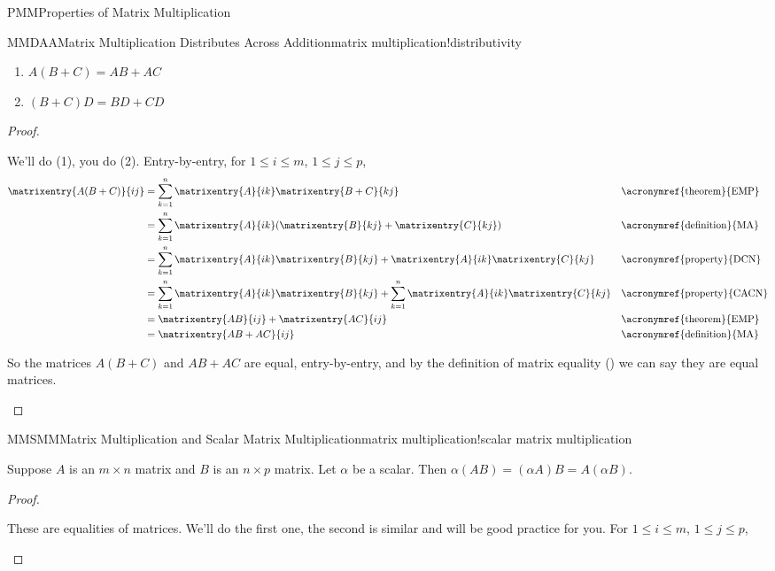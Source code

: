 \begin{subsect}{PMM}{Properties of Matrix Multiplication}
\begin{theorem}{MMDAA}{Matrix Multiplication Distributes Across Addition}{matrix multiplication!distributivity}
\begin{para}
\begin{enumerate}
\item $A(B+C)=AB+AC$
\item $(B+C)D=BD+CD$
\end{enumerate}
\end{para}
\end{theorem}
%
\begin{proof}
\begin{para}We'll do (1), you do (2).  Entry-by-entry, for $1\leq i\leq m$, $1\leq j\leq p$,
%
\begin{align*}
\matrixentry{A(B+C)}{ij}
&=
\sum_{k=1}^{n}\matrixentry{A}{ik}\matrixentry{B+C}{kj}&&\text{\acronymref{theorem}{EMP}}\\
&=\sum_{k=1}^{n}\matrixentry{A}{ik}(\matrixentry{B}{kj}+\matrixentry{C}{kj})&&\text{\acronymref{definition}{MA}}\\
&=\sum_{k=1}^{n}\matrixentry{A}{ik}\matrixentry{B}{kj}+\matrixentry{A}{ik}\matrixentry{C}{kj}
&&\text{\acronymref{property}{DCN}}\\
&=\sum_{k=1}^{n}\matrixentry{A}{ik}\matrixentry{B}{kj}+\sum_{k=1}^{n}\matrixentry{A}{ik}\matrixentry{C}{kj}&&\text{\acronymref{property}{CACN}}\\
&=\matrixentry{AB}{ij}+\matrixentry{AC}{ij}&&\text{\acronymref{theorem}{EMP}}\\
&=\matrixentry{AB+AC}{ij}&&\text{\acronymref{definition}{MA}}
\end{align*}
\end{para}
%
\begin{para}So the matrices $A(B+C)$ and $AB+AC$ are equal, entry-by-entry, and by the definition of matrix equality () we can say they are equal matrices.\end{para}
%
\end{proof}
%
\begin{theorem}{MMSMM}{Matrix Multiplication and Scalar Matrix Multiplication}{matrix multiplication!scalar matrix multiplication}
\begin{para}Suppose $A$ is an $m\times n$ matrix and $B$ is an $n\times p$ matrix.  Let $\alpha$ be a scalar.  Then $\alpha(AB)=(\alpha A)B=A(\alpha B)$.\end{para}
\end{theorem}
%
\begin{proof}
\begin{para}These are equalities of matrices.  We'll do the first one, the second is similar and will be good practice for you.    For $1\leq i\leq m$, $1\leq j\leq p$,

\end{para}
\end{proof}
\end{subsect}

